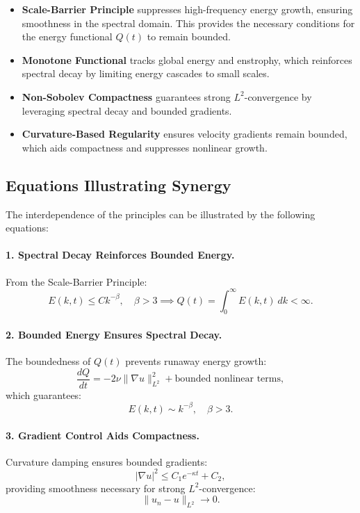 \documentclass[12pt]{article}
\theoremstyle{definition}
\theoremstyle{remark}
\begin{document}
\begin{itemize}
    \item \textbf{Scale-Barrier Principle} suppresses high-frequency energy growth, ensuring smoothness in the spectral domain. This provides the necessary conditions for the energy functional $Q(t)$ to remain bounded.
    \item \textbf{Monotone Functional} tracks global energy and enstrophy, which reinforces spectral decay by limiting energy cascades to small scales.
    \item \textbf{Non-Sobolev Compactness} guarantees strong $L^2$-convergence by leveraging spectral decay and bounded gradients.
    \item \textbf{Curvature-Based Regularity} ensures velocity gradients remain bounded, which aids compactness and suppresses nonlinear growth.
\end{itemize}

\subsection{Equations Illustrating Synergy}
The interdependence of the principles can be illustrated by the following equations:

\paragraph{1. Spectral Decay Reinforces Bounded Energy.}
From the Scale-Barrier Principle:
\begin{equation}
E(k, t) \leq Ck^{-\beta}, \quad \beta > 3 \implies Q(t) = \int_0^\infty E(k, t) \ dk < \infty.
\end{equation}

\paragraph{2. Bounded Energy Ensures Spectral Decay.}
The boundedness of $Q(t)$ prevents runaway energy growth:
\begin{equation}
\frac{dQ}{dt} = -2\nu \|\nabla u\|_{L^2}^2 + \text{bounded nonlinear terms},
\end{equation}
which guarantees:
\begin{equation}
E(k, t) \sim k^{-\beta}, \quad \beta > 3.
\end{equation}

\paragraph{3. Gradient Control Aids Compactness.}
Curvature damping ensures bounded gradients:
\begin{equation}
|\nabla u|^2 \leq C_1 e^{-\kappa t} + C_2,
\end{equation}
providing smoothness necessary for strong $L^2$-convergence:
\begin{equation}
\|u_n - u\|_{L^2} \to 0.
\end{equation}
\end{document}
